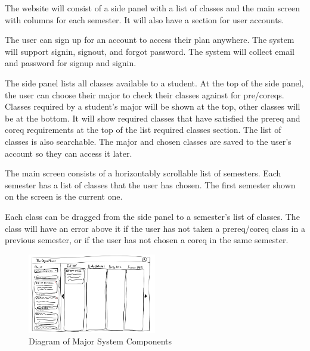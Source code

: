 The website will consist of a side panel with a list of classes and the main
    screen with columns for each semester. It will also have a section for user accounts.

The user can sign up for an account to access their plan anywhere. The system
    will support signin, signout, and forgot password. The system will collect email and
    password for signup and signin.

The side panel lists all classes available to a student. At the top of the side panel,
    the user can choose their major to check their classes against for pre/coreqs.
    Classes required by a student's major will be shown at the top, other classes
    will be at the bottom. It will show required classes that have satisfied
    the prereq and coreq requirements at the top of the list required classes section.
    The list of classes is also searchable. The major and chosen classes are saved
    to the user's account so they can access it later.

The main screen consists of a horizontably scrollable list of semesters. Each
    semester has a list of classes that the user has chosen. The first semester
    shown on the screen is the current one.

Each class can be dragged from the side panel to a semester's list of classes.
    The class will have an error above it if the user has not taken a prereq/coreq class
    in a previous semester, or if the user has not chosen a coreq in the same
    semester.
    
\begin{figure}[h!]
    \centering
    \includegraphics[width=0.5\textwidth]{images/MavDegreePlannerDiagram-Small} %
    \caption{Diagram of Major System Components} %
\end{figure}